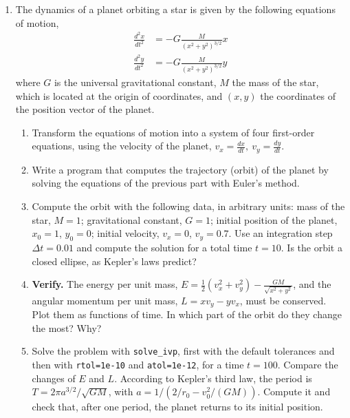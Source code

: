 \begin{enumerate}
\item \label{ej:orbita-en} The dynamics of a planet orbiting a star is given by the following equations of motion,
\begin{align*}
\frac{d^2x}{dt^2} &= -G\frac{M}{(x^2+y^2)^{3/2}}x\\
\frac{d^2y}{dt^2} &= -G\frac{M}{(x^2+y^2)^{3/2}}y
\end{align*}
where $G$ is the universal gravitational constant, $M$ the mass of the star, which is located at the origin of coordinates, and $(x,y)$ the coordinates of the position vector of the planet.
\begin{enumerate}
\item Transform the equations of motion into a system of four first-order equations, using the velocity of the planet, $v_x = \frac{dx}{dt},\ v_y = \frac{dy}{dt}$.
\item Write a program that computes the trajectory (orbit) of the planet by solving the equations of the previous part with Euler's method.
\item Compute the orbit with the following data, in arbitrary units: mass of the star, $M=1$; gravitational constant, $G=1$; initial position of the planet, $x_0 = 1$, $y_0=0$; initial velocity, $v_x = 0$, $v_y = 0.7$. Use an integration step $\Delta t =0.01$ and compute the solution for a total time $t = 10$. Is the orbit a closed ellipse, as Kepler's laws predict?
\item \textbf{Verify.} The energy per unit mass, $E=\frac12(v_x^2+v_y^2)-\frac{GM}{\sqrt{x^2+y^2}}$, and the angular momentum per unit mass, $L=xv_y-yv_x$, must be conserved. Plot them as functions of time. In which part of the orbit do they change the most? Why?
\item Solve the problem with \texttt{solve\_ivp}, first with the default tolerances and then with \texttt{rtol=1e-10} and \texttt{atol=1e-12}, for a time $t=100$. Compare the changes of $E$ and $L$. According to Kepler's third law, the period is $T=2\pi a^{3/2}/\sqrt{GM}$, with $a=1/\left(2/r_0-v_0^2/(GM)\right)$. Compute it and check that, after one period, the planet returns to its initial position.
\end{enumerate}


\end{enumerate}
